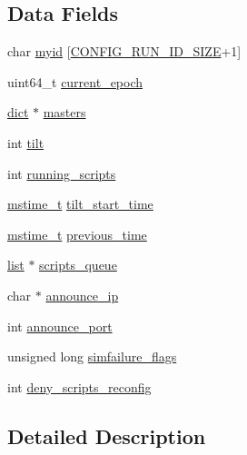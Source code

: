\subsection*{Data Fields}
\begin{DoxyCompactItemize}
\item 
char \hyperlink{structsentinel_state_ae6eea215201bb739eae78c29903a3d12}{myid} \mbox{[}\hyperlink{server_8h_aba6794fa3ee28f85165eaed93190f1df}{C\+O\+N\+F\+I\+G\+\_\+\+R\+U\+N\+\_\+\+I\+D\+\_\+\+S\+I\+ZE}+1\mbox{]}
\item 
uint64\+\_\+t \hyperlink{structsentinel_state_ab523bc9f0cc579208ad514cc588d3981}{current\+\_\+epoch}
\item 
\hyperlink{structdict}{dict} $\ast$ \hyperlink{structsentinel_state_a08cec43573ee36e058c8e7435eac34da}{masters}
\item 
int \hyperlink{structsentinel_state_ac9b882b085644b5b89b27948fb963771}{tilt}
\item 
int \hyperlink{structsentinel_state_a265005cef9f4acb7cdb187306bdc3137}{running\+\_\+scripts}
\item 
\hyperlink{redismodule_8h_a652ae61e2475bc8957454534544968fc}{mstime\+\_\+t} \hyperlink{structsentinel_state_a66a89864156f706449cf8956afd9205b}{tilt\+\_\+start\+\_\+time}
\item 
\hyperlink{redismodule_8h_a652ae61e2475bc8957454534544968fc}{mstime\+\_\+t} \hyperlink{structsentinel_state_a3c93681031930ca24d9d49e9f0b915a0}{previous\+\_\+time}
\item 
\hyperlink{structlist}{list} $\ast$ \hyperlink{structsentinel_state_ace4cd6c34b3e499db1d14fd5d40148e5}{scripts\+\_\+queue}
\item 
char $\ast$ \hyperlink{structsentinel_state_ac7d804aabf6ef8f75aca26fe5ffce26f}{announce\+\_\+ip}
\item 
int \hyperlink{structsentinel_state_a77e2aa70075f866de83d46bdac389fd5}{announce\+\_\+port}
\item 
unsigned long \hyperlink{structsentinel_state_a6412c39d2f06c4c1686f2135cd5bfdd9}{simfailure\+\_\+flags}
\item 
int \hyperlink{structsentinel_state_a70cf76018bdb49cddeaf5f1a5e54b3d9}{deny\+\_\+scripts\+\_\+reconfig}
\end{DoxyCompactItemize}


\subsection{Detailed Description}


